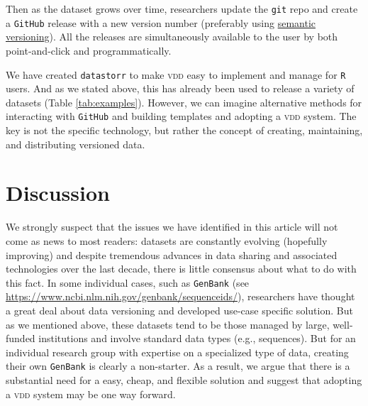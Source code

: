 \documentclass[a4paper,11pt]{article}
\begin{document}
Then as the dataset grows over time, researchers update the \texttt{git} repo and create a \texttt{GitHub} release with a new version number (preferably
using \href{http://semver.org/}{semantic versioning}). All the releases are simultaneously
available to the user by both point-and-click and programmatically. 

We have created \texttt{datastorr} to make \textsc{vdd} easy to implement and manage for \texttt{R} users. And as we stated above, this has already been used to release a variety of datasets (Table \ref{tab:examples}).
However, we can imagine alternative methods for interacting with \texttt{GitHub} and building templates and adopting a \textsc{vdd} system.  The key is not the specific technology, but rather the concept of creating, maintaining, and distributing versioned data.  

\section{Discussion}






We strongly suspect that the issues we have identified in this article will not come as news to most readers: datasets are constantly evolving (hopefully improving) and despite tremendous advances in data sharing and associated technologies over the last decade, there is little consensus about what to do with this fact. In some individual cases, such as \texttt{GenBank} (see \url{https://www.ncbi.nlm.nih.gov/genbank/sequenceids/}), researchers have thought a great deal about data versioning and developed use-case specific solution. But as we mentioned above, these datasets tend to be those managed by large, well-funded institutions and involve standard data types (e.g., sequences). But for an individual research group with expertise on a specialized type of data, creating their own \texttt{GenBank} is clearly a non-starter. As a result, we argue that there is a substantial need for a easy, cheap, and flexible solution and suggest that adopting a \textsc{vdd} system may be one way forward.
\end{document}
